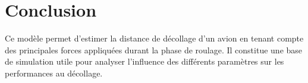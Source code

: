 







































\chapter{Conclusion}\label{ch:conclusion}

Ce modèle permet d’estimer la distance de décollage d’un avion en tenant compte des principales forces appliquées durant la phase de roulage. Il constitue une base de simulation utile pour analyser l’influence des différents paramètres sur les performances au décollage.
